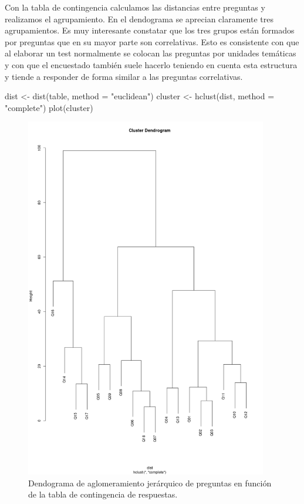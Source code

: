 \documentclass[
  12pt,
  a4paper,
  extrafontsizes,
  onecolumn,
  openright]{memoir}
\newenvironment{Shaded}{\begin{snugshade}}{\end{snugshade}}
\newcommand{\AttributeTok}[1]{\textcolor[rgb]{0.40,0.45,0.13}{#1}}
\newcommand{\FunctionTok}[1]{\textcolor[rgb]{0.28,0.35,0.67}{#1}}
\newcommand{\NormalTok}[1]{\textcolor[rgb]{0.00,0.23,0.31}{#1}}
\newcommand{\OtherTok}[1]{\textcolor[rgb]{0.00,0.23,0.31}{#1}}
\newcommand{\StringTok}[1]{\textcolor[rgb]{0.13,0.47,0.30}{#1}}
\begin{document}
\normalsize

Con la tabla de contingencia calculamos las distancias entre preguntas y
realizamos el agrupamiento. En el dendograma se aprecian claramente tres
agrupamientos. Es muy interesante constatar que los tres grupos están
formados por preguntas que en su mayor parte son correlativas. Esto es
consistente con que al elaborar un test normalmente se colocan las
preguntas por unidades temáticas y con que el encuestado también suele
hacerlo teniendo en cuenta esta estructura y tiende a responder de forma
similar a las preguntas correlativas.

\begin{Shaded}
\begin{Highlighting}[]
\NormalTok{dist }\OtherTok{\textless{}{-}} \FunctionTok{dist}\NormalTok{(table, }\AttributeTok{method =} \StringTok{"euclidean"}\NormalTok{)}
\NormalTok{cluster }\OtherTok{\textless{}{-}} \FunctionTok{hclust}\NormalTok{(dist, }\AttributeTok{method =} \StringTok{"complete"}\NormalTok{)}
\FunctionTok{plot}\NormalTok{(cluster)}
\end{Highlighting}
\end{Shaded}

\begin{figure}[h]

{\centering \includegraphics[width=4.16667in,height=\textheight]{images/cluster.png}

}

\caption{Dendograma de aglomeramiento jerárquico de preguntas en función
de la tabla de contingencia de respuestas.}

\end{figure}
\end{document}

